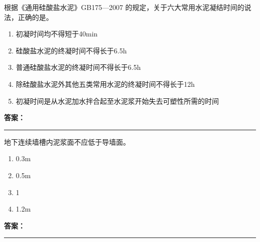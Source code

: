 \documentclass[UTF8,fontset=fandol,11pt]{ctexart}
\newcommand{\answerline}{\textcolor{answerred}{\rule{2.4cm}{0.7pt}}}
\begin{document}
\begin{quizbox}[title={乱序第 137 题｜第四章混凝土结构工程}]

根据《通用硅酸盐水泥》GB175—2007 的规定，关于六大常用水泥凝结时间的说法，正确的是。\\

\begin{enumerate}[label=\Alph*.]

\item 初凝时间均不得短于40min

\item 硅酸盐水泥的终凝时间不得长于6.5h

\item 普通硅酸盐水泥的终凝时间不得长于6.5h

\item 除硅酸盐水泥外其他五类常用水泥的终凝时间不得长于12h

\item 初凝时间是从水泥加水拌合起至水泥浆开始失去可塑性所需的时间

\end{enumerate}

\textbf{\textcolor{answerred}{答案：}} \answerline

\end{quizbox}

\vspace{0.2em}

\begin{quizbox}[title={乱序第 138 题｜第三章基坑工程}]

地下连续墙槽内泥浆面不应低于导墙面。\\

\begin{enumerate}[label=\Alph*.]

\item 0.3m

\item 0.5m

\item 1

\item 1.2m

\end{enumerate}

\textbf{\textcolor{answerred}{答案：}} \answerline

\end{quizbox}

\vspace{0.2em}
\end{document}
